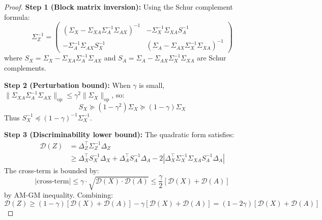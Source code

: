 \begin{proof}
\textbf{Step 1 (Block matrix inversion):}
Using the Schur complement formula:
\begin{equation}
    \Sigma_Z^{-1} = \begin{pmatrix} (\Sigma_X - \Sigma_{XA}\Sigma_A^{-1}\Sigma_{AX})^{-1} & -\Sigma_X^{-1}\Sigma_{XA}S_A^{-1} \\
    -\Sigma_A^{-1}\Sigma_{AX}S_X^{-1} & (\Sigma_A - \Sigma_{AX}\Sigma_X^{-1}\Sigma_{XA})^{-1} \end{pmatrix}
\end{equation}
where $S_X = \Sigma_X - \Sigma_{XA}\Sigma_A^{-1}\Sigma_{AX}$ and $S_A = \Sigma_A - \Sigma_{AX}\Sigma_X^{-1}\Sigma_{XA}$ are Schur complements.

\textbf{Step 2 (Perturbation bound):}
When $\gamma$ is small, $\|\Sigma_{XA}\Sigma_A^{-1}\Sigma_{AX}\|_{\mathrm{op}} \leq \gamma^2 \|\Sigma_X\|_{\mathrm{op}}$, so:
\begin{equation}
    S_X \succeq (1 - \gamma^2) \Sigma_X \succeq (1 - \gamma) \Sigma_X
\end{equation}
Thus $S_X^{-1} \preceq (1-\gamma)^{-1} \Sigma_X^{-1}$.

\textbf{Step 3 (Discriminability lower bound):}
The quadratic form satisfies:
\begin{align}
    \mathcal{D}(Z) &= \Delta_Z^\top \Sigma_Z^{-1} \Delta_Z \\
    &\geq \Delta_X^\top S_X^{-1} \Delta_X + \Delta_A^\top S_A^{-1} \Delta_A - 2|\Delta_X^\top \Sigma_X^{-1}\Sigma_{XA}S_A^{-1} \Delta_A|
\end{align}
The cross-term is bounded by:
\begin{equation}
    |\text{cross-term}| \leq \gamma \cdot \sqrt{\mathcal{D}(X) \cdot \mathcal{D}(A)} \leq \frac{\gamma}{2}[\mathcal{D}(X) + \mathcal{D}(A)]
\end{equation}
by AM-GM inequality. Combining:
\begin{equation}
    \mathcal{D}(Z) \geq (1-\gamma)[\mathcal{D}(X) + \mathcal{D}(A)] - \gamma[\mathcal{D}(X) + \mathcal{D}(A)] = (1-2\gamma)[\mathcal{D}(X) + \mathcal{D}(A)]
\end{equation}
\end{proof}

